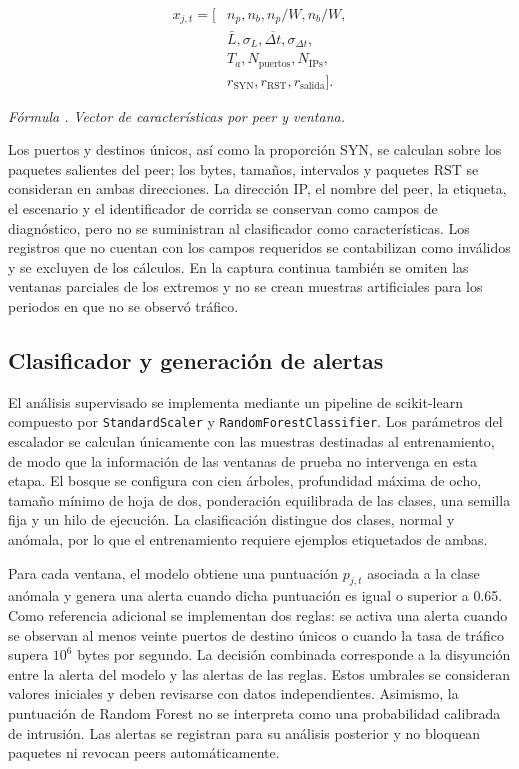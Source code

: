 \documentclass[conference]{IEEEtran}
\newcounter{formulanumber}
\newcommand{\formulacaption}[1]{%
  \par\smallskip\noindent\refstepcounter{formulanumber}%
  \textit{Fórmula \theformulanumber.} \textit{#1}\par\smallskip}
\begin{document}
\begin{equation*}
\begin{aligned}
x_{j,t} = [&n_p,n_b,n_p/W,n_b/W,\\
&\bar{L},\sigma_L,\overline{\Delta t},\sigma_{\Delta t},\\
&T_a,N_{\mathrm{puertos}},N_{\mathrm{IPs}},\\
&r_{\mathrm{SYN}},r_{\mathrm{RST}},r_{\mathrm{salida}}].
\end{aligned}
\end{equation*}
\formulacaption{Vector de características por peer y ventana.}
Los puertos y destinos únicos, así como la proporción SYN, se calculan sobre los paquetes salientes del peer; los bytes, tamaños, intervalos y paquetes RST se consideran en ambas direcciones. La dirección IP, el nombre del peer, la etiqueta, el escenario y el identificador de corrida se conservan como campos de diagnóstico, pero no se suministran al clasificador como características. Los registros que no cuentan con los campos requeridos se contabilizan como inválidos y se excluyen de los cálculos. En la captura continua también se omiten las ventanas parciales de los extremos y no se crean muestras artificiales para los periodos en que no se observó tráfico.

\subsection{Clasificador y generación de alertas}
El análisis supervisado se implementa mediante un pipeline de scikit-learn compuesto por \texttt{StandardScaler} y \texttt{RandomForestClassifier}. Los parámetros del escalador se calculan únicamente con las muestras destinadas al entrenamiento, de modo que la información de las ventanas de prueba no intervenga en esta etapa. El bosque se configura con cien árboles, profundidad máxima de ocho, tamaño mínimo de hoja de dos, ponderación equilibrada de las clases, una semilla fija y un hilo de ejecución. La clasificación distingue dos clases, normal y anómala, por lo que el entrenamiento requiere ejemplos etiquetados de ambas.

Para cada ventana, el modelo obtiene una puntuación $p_{j,t}$ asociada a la clase anómala y genera una alerta cuando dicha puntuación es igual o superior a 0.65. Como referencia adicional se implementan dos reglas: se activa una alerta cuando se observan al menos veinte puertos de destino únicos o cuando la tasa de tráfico supera $10^6$ bytes por segundo. La decisión combinada corresponde a la disyunción entre la alerta del modelo y las alertas de las reglas. Estos umbrales se consideran valores iniciales y deben revisarse con datos independientes. Asimismo, la puntuación de Random Forest no se interpreta como una probabilidad calibrada de intrusión. Las alertas se registran para su análisis posterior y no bloquean paquetes ni revocan peers automáticamente.
\end{document}

